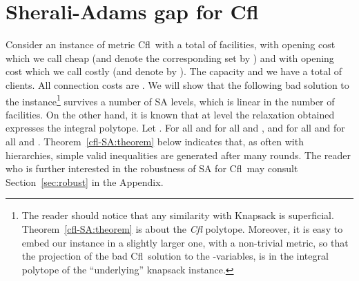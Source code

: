 \documentclass[11pt]{article}
\newcommand{\lbfl}{{\sc Lbfl}}
\newcommand{\cfl}{{\sc Cfl}}
\begin{document}
\begin{comment}  The second well-known LP  is the star relaxation.
A {\em star} is a set consisting of some  clients and
one facility. Let  be a set of stars. For a star   let   be an indicator variable denoting
whether   is picked.   The cost   of star    is equal
to the opening cost of the corresponding facility plus the cost of
connecting the star's clients to it. 
\iffalse     \fi


Defining  as the set of all stars  where  the total number of the clients in  
is at most the
capacity  (at least the bound ),  we get corresponding relaxations for
  \cfl\ (\lbfl).
In the rest of the paper we  slightly abuse terminology by 
using    {\em (LP-star)}  to refer to the
star relaxation for the problem we examine each time (\cfl\  or \lbfl).

It is well known  that for both \cfl\ and \lbfl, (LP-classic) and (LP-star) are
equivalent, therefore (LP-star) can be solved in  polynomial time.
\end{comment}   






\section{Sherali-Adams gap for \cfl }\label{SA-result}

Consider an  instance of metric  \cfl\ with a  total of
 facilities,   with opening cost   which we  call cheap (and
denote the corresponding set by ) and  with opening cost 
which   we  call  costly   (and  denote   by
).  The  capacity    and  we have  a  total  of  
clients. All connection costs are . We will show that the following
bad solution   to the instance\footnote{The reader should notice
  that any similarity with Knapsack is
  superficial. Theorem~\ref{cfl-SA:theorem} is about the {\em \cfl}
    polytope. Moreover, it is easy to embed our instance 
 in a slightly larger one, with a non-trivial metric,  so that 
the projection of the bad \cfl\ solution
to the -variables, is in the integral polytope of the ``underlying''
     knapsack  instance.
}
  survives a  number of SA levels, which is  linear 
in the number  of facilities. On the other hand, it
is known that 
at level  the  relaxation obtained expresses the integral polytope.
Let  .  For all    and  for all  
 and  , and for  all 
and     for     all               and
. Theorem~\ref{cfl-SA:theorem} below
indicates that, as often with hierarchies,  simple valid inequalities are
generated after many rounds.  The reader who is further interested in
the robustness of SA for \cfl\ may consult Section~\ref{sec:robust} in
the Appendix. 
\end{document}
